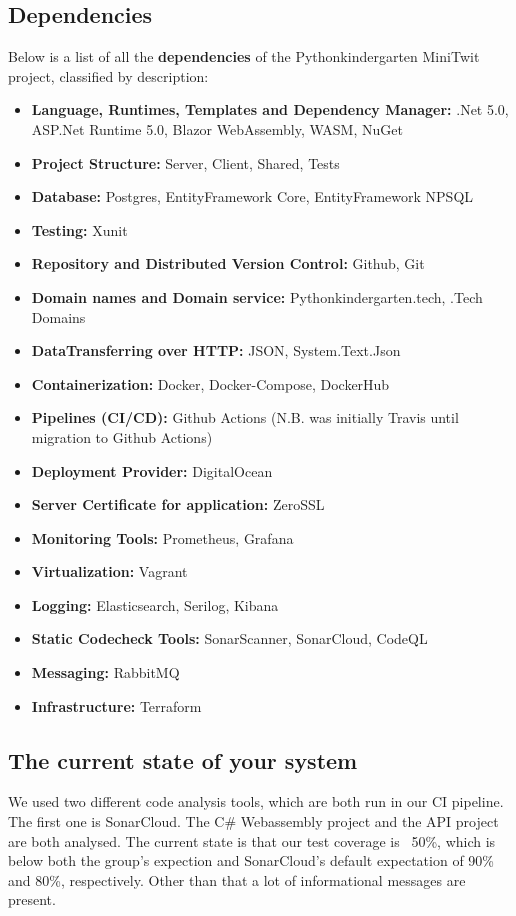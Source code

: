 \subsection{Dependencies}
Below is a list of all the \textbf{dependencies} of the Pythonkindergarten MiniTwit project, classified by description:
\begin{itemize}
    \item \textbf{Language, Runtimes, Templates and Dependency Manager:}
      .Net 5.0, ASP.Net Runtime 5.0, Blazor WebAssembly, WASM, NuGet
    \item \textbf{Project Structure:} Server, Client, Shared, Tests
    \item \textbf{Database:} Postgres, EntityFramework Core, EntityFramework NPSQL
    \item \textbf{Testing:} Xunit
    \item \textbf{Repository and Distributed Version Control:} Github, Git
    \item \textbf{Domain names and Domain service:} Pythonkindergarten.tech, .Tech Domains
    \item \textbf{DataTransferring over HTTP:} JSON, System.Text.Json
    \item \textbf{Containerization:} Docker, Docker-Compose, DockerHub
    \item \textbf{Pipelines (CI/CD):} Github Actions (N.B. was initially Travis until migration to Github Actions)
    \item \textbf{Deployment Provider:} DigitalOcean
    \item \textbf{Server Certificate for application:} ZeroSSL
    \item \textbf{Monitoring Tools:} Prometheus, Grafana
    \item \textbf{Virtualization:} Vagrant
    \item \textbf{Logging:} Elasticsearch, Serilog, Kibana
    \item \textbf{Static Codecheck Tools:} SonarScanner, SonarCloud, CodeQL
    \item \textbf{Messaging:} RabbitMQ
    \item \textbf{Infrastructure:} Terraform
\end{itemize}


\subsection{The current state of your system}
We used two different code analysis tools, which are both run in our CI pipeline. 
The first one is SonarCloud. The C\# Webassembly project and the API project are both analysed. 
The current state is that our test coverage is ~50\%, which is below both the group's expection and SonarCloud's default expectation of 90\% and 80\%, respectively. 
Other than that a lot of informational messages are present. 

